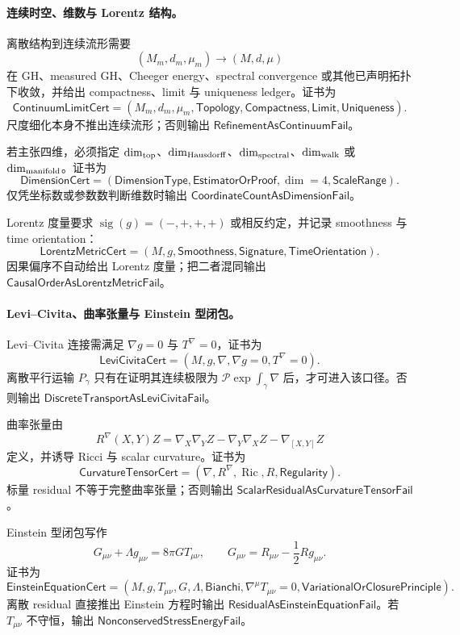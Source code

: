 \paragraph{连续时空、维数与 Lorentz 结构。}
离散结构到连续流形需要
\[
(M_m,d_m,\mu_m)\to(M,d,\mu)
\]
在 GH、measured GH、Cheeger energy、spectral convergence 或其他已声明拓扑下收敛，并给出 compactness、limit 与 uniqueness ledger。证书为
\[
\boxed{\mathsf{ContinuumLimitCert}=(M_m,d_m,\mu_m,\mathsf{Topology},\mathsf{Compactness},\mathsf{Limit},\mathsf{Uniqueness}).}
\]
尺度细化本身不推出连续流形；否则输出 \(\mathsf{RefinementAsContinuumFail}\)。

若主张四维，必须指定 \(\dim_{\rm top}\)、\(\dim_{\rm Hausdorff}\)、\(\dim_{\rm spectral}\)、\(\dim_{\rm walk}\) 或 \(\dim_{\rm manifold}\)。证书为
\[
\boxed{\mathsf{DimensionCert}=(\mathsf{DimensionType},\mathsf{EstimatorOrProof},\dim=4,\mathsf{ScaleRange}).}
\]
仅凭坐标数或参数数判断维数时输出 \(\mathsf{CoordinateCountAsDimensionFail}\)。

Lorentz 度量要求 \(\operatorname{sig}(g)=(-,+,+,+)\) 或相反约定，并记录 smoothness 与 time orientation：
\[
\boxed{\mathsf{LorentzMetricCert}=(M,g,\mathsf{Smoothness},\mathsf{Signature},\mathsf{TimeOrientation}).}
\]
因果偏序不自动给出 Lorentz 度量；把二者混同输出 \(\mathsf{CausalOrderAsLorentzMetricFail}\)。

\paragraph{Levi--Civita、曲率张量与 Einstein 型闭包。}
Levi--Civita 连接需满足 \(\nabla g=0\) 与 \(T^\nabla=0\)，证书为
\[
\boxed{\mathsf{LeviCivitaCert}=(M,g,\nabla,\nabla g=0,T^\nabla=0).}
\]
离散平行运输 \(P_\gamma\) 只有在证明其连续极限为 \(\mathcal P\exp\int_\gamma\nabla\) 后，才可进入该口径。否则输出 \(\mathsf{DiscreteTransportAsLeviCivitaFail}\)。

曲率张量由
\[
R^\nabla(X,Y)Z=\nabla_X\nabla_YZ-\nabla_Y\nabla_XZ-\nabla_{[X,Y]}Z
\]
定义，并诱导 Ricci 与 scalar curvature。证书为
\[
\boxed{\mathsf{CurvatureTensorCert}=(\nabla,R^\nabla,\operatorname{Ric},R,\mathsf{Regularity}).}
\]
标量 residual 不等于完整曲率张量；否则输出 \(\mathsf{ScalarResidualAsCurvatureTensorFail}\)。

Einstein 型闭包写作
\[
G_{\mu\nu}+\Lambda g_{\mu\nu}=8\pi G T_{\mu\nu},\qquad
G_{\mu\nu}=R_{\mu\nu}-\frac12Rg_{\mu\nu}.
\]
证书为
\[
\boxed{\mathsf{EinsteinEquationCert}=(M,g,T_{\mu\nu},G,\Lambda,\mathsf{Bianchi},\nabla^\mu T_{\mu\nu}=0,\mathsf{VariationalOrClosurePrinciple}).}
\]
离散 residual 直接推出 Einstein 方程时输出 \(\mathsf{ResidualAsEinsteinEquationFail}\)。若 \(T_{\mu\nu}\) 不守恒，输出 \(\mathsf{NonconservedStressEnergyFail}\)。

